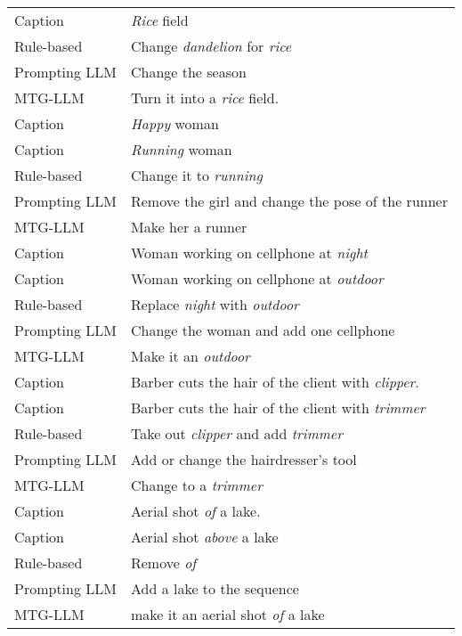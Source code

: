 \begin{table}
\begin{tabular}{ll}
    Caption & \textit{Rice} field  \\
    Rule-based & Change \textit{dandelion} for \textit{rice} \\
    Prompting LLM & Change the season \\
    MTG-LLM & Turn it into a \textit{rice} field. \\
    \midrule
    Caption & \textit{Happy} woman \\
    Caption & \textit{Running} woman \\
    Rule-based & Change it to \textit{running} \\
    Prompting LLM & Remove the girl and change the pose of the runner \\
    MTG-LLM & Make her a runner \\
    \midrule
    Caption & Woman working on cellphone at \textit{night}  \\
    Caption & Woman working on cellphone at \textit{outdoor} \\
    Rule-based & Replace \textit{night} with \textit{outdoor} \\
    Prompting LLM & Change the woman and add one cellphone \\
    MTG-LLM & Make it an \textit{outdoor} \\
    \midrule
    Caption & Barber cuts the hair of the client with \textit{clipper}. \\
    Caption & Barber cuts the hair of the client with \textit{trimmer} \\
    Rule-based & Take out \textit{clipper} and add \textit{trimmer} \\
    Prompting LLM & Add or change the hairdresser's tool \\
    MTG-LLM & Change to a \textit{trimmer} \\
    \midrule
    Caption & Aerial shot \textit{of} a lake. \\
    Caption & Aerial shot \textit{above} a lake  \\
    Rule-based & Remove \textit{of} \\
    Prompting LLM & Add a lake to the sequence \\
    MTG-LLM & make it an aerial shot \textit{of} a lake \\
    \bottomrule
\end{tabular}
\end{table}


 
